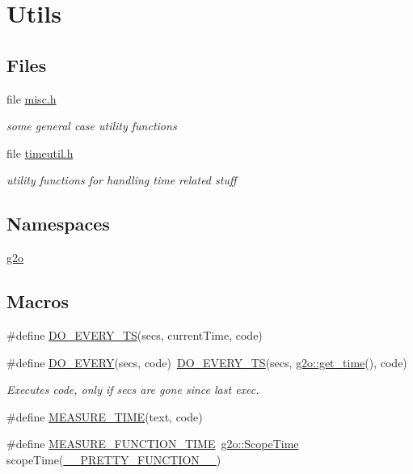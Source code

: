 \hypertarget{group__utils}{}\section{Utils}
\label{group__utils}
\subsection*{Files}
\begin{DoxyCompactItemize}
\item 
file \mbox{\hyperlink{misc_8h}{misc.\+h}}
\begin{DoxyCompactList}\small\item\em some general case utility functions \end{DoxyCompactList}\item 
file \mbox{\hyperlink{timeutil_8h}{timeutil.\+h}}
\begin{DoxyCompactList}\small\item\em utility functions for handling time related stuff \end{DoxyCompactList}\end{DoxyCompactItemize}
\subsection*{Namespaces}
\begin{DoxyCompactItemize}
\item 
 \mbox{\hyperlink{namespaceg2o}{g2o}}
\end{DoxyCompactItemize}
\subsection*{Macros}
\begin{DoxyCompactItemize}
\item 
\#define \mbox{\hyperlink{group__utils_ga9b9f34c01b03b47644c2762bf256be32}{D\+O\+\_\+\+E\+V\+E\+R\+Y\+\_\+\+TS}}(secs,  current\+Time,  code)
\item 
\#define \mbox{\hyperlink{group__utils_gabfe958da8833edbe74250507adc61635}{D\+O\+\_\+\+E\+V\+E\+RY}}(secs,  code)~\mbox{\hyperlink{group__utils_ga9b9f34c01b03b47644c2762bf256be32}{D\+O\+\_\+\+E\+V\+E\+R\+Y\+\_\+\+TS}}(secs, \mbox{\hyperlink{namespaceg2o_a6baa8fdfd973b5b970df14f14fd5d844}{g2o\+::get\+\_\+time}}(), code)
\begin{DoxyCompactList}\small\item\em Executes code, only if secs are gone since last exec. \end{DoxyCompactList}\item 
\#define \mbox{\hyperlink{group__utils_gaafc27d8d00ac925dce6e52a013cc2b32}{M\+E\+A\+S\+U\+R\+E\+\_\+\+T\+I\+ME}}(text,  code)
\item 
\#define \mbox{\hyperlink{group__utils_gae79acf8eb730f80c029d60e19332b4b9}{M\+E\+A\+S\+U\+R\+E\+\_\+\+F\+U\+N\+C\+T\+I\+O\+N\+\_\+\+T\+I\+ME}}~\mbox{\hyperlink{classg2o_1_1_scope_time}{g2o\+::\+Scope\+Time}} scope\+Time(\mbox{\hyperlink{macros_8h_a9c15fe1e91b07ea3280f5239f9841b67}{\+\_\+\+\_\+\+P\+R\+E\+T\+T\+Y\+\_\+\+F\+U\+N\+C\+T\+I\+O\+N\+\_\+\+\_\+}})
\end{DoxyCompactItemize}
